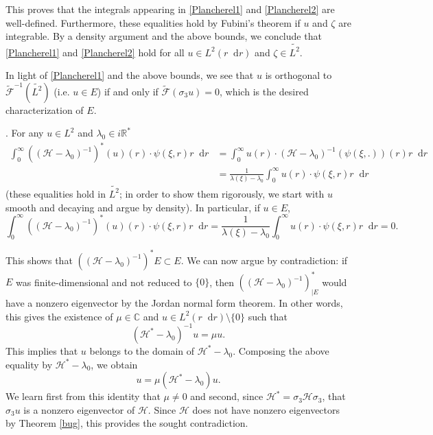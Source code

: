 \documentclass[11 pt]{amsart}
\newcommand{\tmem}{\underline}
\newcommand{\nobracket}{}
\theoremstyle{definition}
\theoremstyle{remark}
\numberwithin{equation}{section}
\newcommand{\dd}{\mathop{}\!\mathrm{d}}
\begin{document}
This proves that the integrals appearing in \eqref{Plancherel1} and \eqref{Plancherel2} are well-defined. Furthermore, these equalities hold by Fubini's theorem if $u$ and $\zeta$ are integrable. By a density argument and the above bounds, we conclude that \eqref{Plancherel1} and \eqref{Plancherel2} hold for all $u \in L^2 (r \dd r)$ and $\zeta \in \widetilde{L^2}$.

In light of \eqref{Plancherel1} and the above bounds, we see that $u$ is orthogonal to $\widetilde{\mathcal F}^{-1} (\widetilde{L^2})$ (i.e. $u \in E$) if and only if $\widetilde{\mathcal F}(\sigma_3 u) = 0$, which is the desired characterization of $E$.

\medskip
  
\noindent {\tmem{Step 4. $E = \{ 0 \}$ or $\dim E = + \infty$}}.
For any $u \in L^2$ and $\lambda_0 \in i\mathbb{R}^{\ast}$
\begin{align*}
\int_0^\infty ((\mathcal{H}- \lambda_0)^{- 1})^{\ast} (u) (r) \cdot 
    \psi (\xi, r) r \dd r & = \int_0^\infty u (r) \cdot (\mathcal{H}- \lambda_0)^{- 1} (\psi (\xi,
    .)) (r) r \dd r \\
    & = \frac{1}{\lambda (\xi) - \lambda_0} \int_0^\infty u (r) \cdot \psi
    (\xi, r) r \dd r
  \end{align*}
(these equalities hold in $\widetilde{L^2}$; in order to show them rigorously, we start with $u$ smooth and decaying and argue by density). In particular, if $u \in E$,
$$
\int_0^\infty ((\mathcal{H}- \lambda_0)^{- 1})^{\ast} (u) (r) \cdot 
    \psi (\xi, r) r \dd r = \frac{1}{\lambda (\xi) - \lambda_0} \int_0^\infty u (r) \cdot \psi
    (\xi, r) r \dd r = 0.
$$

This shows that $((\mathcal{H}-\lambda_0)^{- 1})^{\ast} E \subset E$. We can now argue by contradiction: if $E$ was finite-dimensional and not reduced to $\{0 \}$, then $((\mathcal{H}-\lambda_0)^{- 1})_{| E \nobracket}^{\ast}$ would have a nonzero eigenvector by the Jordan normal form theorem. In other words, this gives the existence of $\mu \in \mathbb{C}$ and $u \in L^2(r \dd r) \setminus \{ 0 \}$ such that
$$
(\mathcal{H}^\ast - \lambda_0)^{-1} u = \mu u.
$$
This implies that $u$ belongs to the domain of $\mathcal{H}^\ast-\lambda_0$. Composing the above equality by $\mathcal{H}^\ast - \lambda_0$, we obtain
$$
u = \mu (\mathcal{H}^\ast - \lambda_0) u.
$$
We learn first from this identity that $\mu \neq 0$ and second, since $\mathcal{H}^\ast = \sigma_3 \mathcal{H} \sigma_3$, that $\sigma_3 u$ is a nonzero eigenvector of $\mathcal{H}$. Since $\mathcal{H}$ does not have nonzero eigenvectors by Theorem \ref{bug}, this provides the sought contradiction.
  
\end{document}
